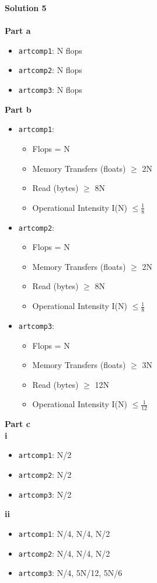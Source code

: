 \documentclass[letterpaper, 11pt]{article}
\begin{document}
\textbf{Solution 5}\\ \\
\textbf{Part a}
\begin{itemize}
\item \texttt{artcomp1}: N flops
\item \texttt{artcomp2}: N flops
\item \texttt{artcomp3}: N flops
\end{itemize}
\textbf{Part b}
\begin{itemize}
\item \texttt{artcomp1}: 
\begin{itemize}
\item Flops = N
\item Memory Transfers (floats) $\geq$ 2N
\item Read (bytes) $\geq$ 8N
\item Operational Intensity I(N)  $\leq \frac{1}{8}$ 
\end{itemize}
\item \texttt{artcomp2}: 
\begin{itemize}
\item Flops = N
\item Memory Transfers (floats) $\geq$ 2N
\item Read (bytes) $\geq$ 8N
\item Operational Intensity I(N)  $\leq \frac{1}{8}$ 
\end{itemize}
\item \texttt{artcomp3}: 
\begin{itemize}
\item Flops = N
\item Memory Transfers (floats) $\geq$ 3N
\item Read (bytes) $\geq$ 12N
\item Operational Intensity I(N)  $\leq \frac{1}{12}$ 
\end{itemize}
\end{itemize}
\textbf{Part c} \\
\textbf{i}
\begin{itemize}
\item \texttt{artcomp1}:  N/2
\item \texttt{artcomp2}:  N/2
\item \texttt{artcomp3}:  N/2
\end{itemize}
\textbf{ii}
\begin{itemize}
\item \texttt{artcomp1}:  N/4, N/4, N/2
\item \texttt{artcomp2}:  N/4, N/4, N/2
\item \texttt{artcomp3}:  N/4, 5N/12, 5N/6
\end{itemize}
\bigskip

\clearpage

\end{document}
